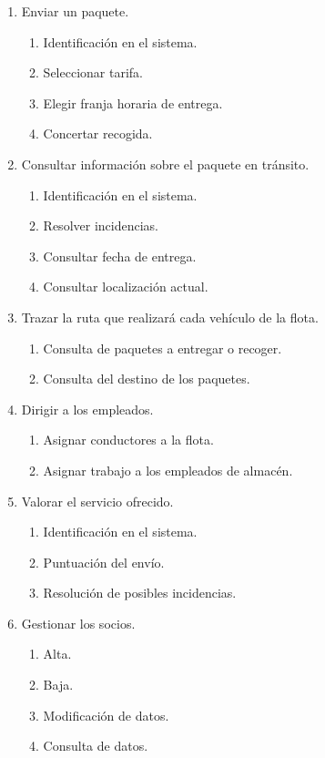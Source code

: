 \documentclass[12pt,spanish]{article}
\begin{document}
\begin{enumerate}[label=\textbf{CU-\arabic*}]
	\item Enviar un paquete.
	\begin{enumerate}[label=\textbf{CU-1.\arabic*}]
		\item Identificación en el sistema.
		\item Seleccionar tarifa.
		\item Elegir franja horaria de entrega.
		\item Concertar recogida.
	\end{enumerate}
	\item Consultar información sobre el paquete en tránsito.
	\begin{enumerate}[label=\textbf{CU-2.\arabic*}]
		\item Identificación en el sistema.
		\item Resolver incidencias.
		\item Consultar fecha de entrega.
		\item Consultar localización actual.
	\end{enumerate}
	\item Trazar la ruta que realizará cada vehículo de la flota.
	\begin{enumerate}[label=\textbf{CU-3.\arabic*}]
		\item Consulta de paquetes a entregar o recoger.
		\item Consulta del destino de los paquetes.	
	\end{enumerate}
	\item Dirigir a los empleados.
	\begin{enumerate}[label=\textbf{CU-4.\arabic*}]
		\item Asignar conductores a la flota.
		\item Asignar trabajo a los empleados de almacén.	
	\end{enumerate}
	\item Valorar el servicio ofrecido.
	\begin{enumerate}[label=\textbf{CU-5.\arabic*}]
		\item Identificación en el sistema.
		\item Puntuación del envío.
		\item Resolución de posibles incidencias.
	\end{enumerate}
	\item Gestionar los socios.
	\begin{enumerate}[label=\textbf{CU-6.\arabic*}]
		\item Alta.
		\item Baja.
		\item Modificación de datos.
		\item Consulta de datos.
	\end{enumerate}

\end{enumerate}
\end{document}
